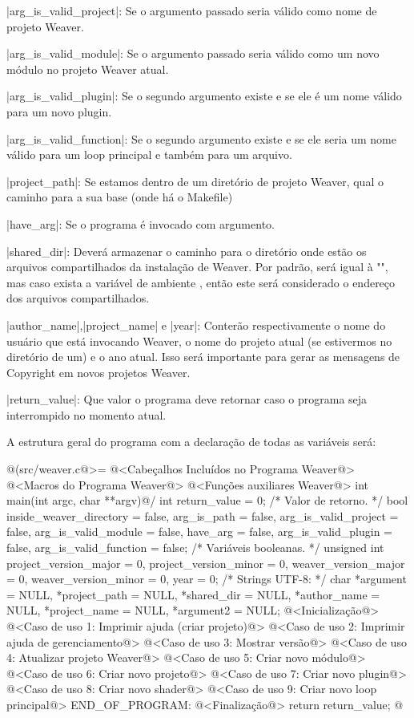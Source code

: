 |arg_is_valid_project|: Se o argumento passado seria válido como
  nome de projeto Weaver.

|arg_is_valid_module|: Se o argumento passado seria válido como
  um novo módulo no projeto Weaver atual.

|arg_is_valid_plugin|: Se o segundo argumento existe e se ele é um
 nome válido para um novo plugin.

|arg_is_valid_function|: Se o segundo argumento existe e se ele seria
 um nome válido para um loop principal e também para um arquivo.

|project_path|: Se estamos dentro de um diretório de projeto
  Weaver, qual o caminho para a sua base (onde há o Makefile)

|have_arg|: Se o programa é invocado com argumento.

|shared_dir|: Deverá armazenar o caminho para o diretório onde
  estão os arquivos compartilhados da instalação de Weaver. Por
  padrão, será igual à "", mas caso exista a
  variável de ambiente , então este será
  considerado o endereço dos arquivos compartilhados.

|author_name|,|project_name| e |year|: Conterão respectivamente o
  nome do usuário que está invocando Weaver, o nome do projeto atual
  (se estivermos no diretório de um) e o ano atual. Isso será
  importante para gerar as mensagens de Copyright em novos projetos
  Weaver.

|return_value|: Que valor o programa deve retornar caso o programa
  seja interrompido no momento atual.

A estrutura geral do programa com a declaração de todas as variáveis
será:

\iniciocodigo
@(src/weaver.c@>=
@<Cabeçalhos Incluídos no Programa Weaver@>
@<Macros do Programa Weaver@>
@<Funções auxiliares Weaver@>
int main(int argc, char **argv){@/
  int return_value = 0; /* Valor de retorno. */
  bool inside_weaver_directory = false, arg_is_path = false,
    arg_is_valid_project = false, arg_is_valid_module = false,
    have_arg = false, arg_is_valid_plugin = false,
    arg_is_valid_function = false; /* Variáveis booleanas. */
  unsigned int project_version_major = 0, project_version_minor = 0,
    weaver_version_major = 0, weaver_version_minor = 0,
    year = 0;
  /* Strings UTF-8: */
  char *argument = NULL, *project_path = NULL, *shared_dir = NULL,
    *author_name = NULL, *project_name = NULL, *argument2 = NULL;
  @<Inicialização@>
  @<Caso de uso 1: Imprimir ajuda (criar projeto)@>
  @<Caso de uso 2: Imprimir ajuda de gerenciamento@>
  @<Caso de uso 3: Mostrar versão@>
  @<Caso de uso 4: Atualizar projeto Weaver@>
  @<Caso de uso 5: Criar novo módulo@>
  @<Caso de uso 6: Criar novo projeto@>
  @<Caso de uso 7: Criar novo plugin@>
  @<Caso de uso 8: Criar novo shader@>
  @<Caso de uso 9: Criar novo loop principal@>
END_OF_PROGRAM:
  @<Finalização@>
  return return_value;
}
@
\fimcodigo

